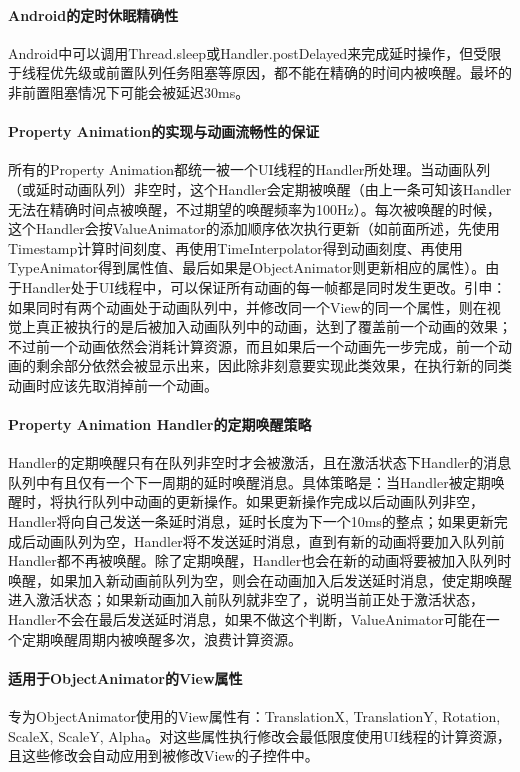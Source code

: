 \documentclass[UTF8]{ctexart}
\begin{document}
    \paragraph{Android的定时休眠精确性}
    Android中可以调用Thread.sleep或Handler.postDelayed来完成延时操作，但受限于线程优先级或前置队列任务阻塞等原因，都不能在精确的时间内被唤醒。最坏的非前置阻塞情况下可能会被延迟30ms。
    \paragraph{Property Animation的实现与动画流畅性的保证}
    所有的Property Animation都统一被一个UI线程的Handler所处理。当动画队列（或延时动画队列）非空时，这个Handler会定期被唤醒（由上一条可知该Handler无法在精确时间点被唤醒，不过期望的唤醒频率为100Hz）。每次被唤醒的时候，这个Handler会按ValueAnimator的添加顺序依次执行更新（如前面所述，先使用Timestamp计算时间刻度、再使用TimeInterpolator得到动画刻度、再使用TypeAnimator得到属性值、最后如果是ObjectAnimator则更新相应的属性）。由于Handler处于UI线程中，可以保证所有动画的每一帧都是同时发生更改。引申：如果同时有两个动画处于动画队列中，并修改同一个View的同一个属性，则在视觉上真正被执行的是后被加入动画队列中的动画，达到了覆盖前一个动画的效果；不过前一个动画依然会消耗计算资源，而且如果后一个动画先一步完成，前一个动画的剩余部分依然会被显示出来，因此除非刻意要实现此类效果，在执行新的同类动画时应该先取消掉前一个动画。
    \paragraph{Property Animation Handler的定期唤醒策略}
    Handler的定期唤醒只有在队列非空时才会被激活，且在激活状态下Handler的消息队列中有且仅有一个下一周期的延时唤醒消息。具体策略是：当Handler被定期唤醒时，将执行队列中动画的更新操作。如果更新操作完成以后动画队列非空，Handler将向自己发送一条延时消息，延时长度为下一个10ms的整点；如果更新完成后动画队列为空，Handler将不发送延时消息，直到有新的动画将要加入队列前Handler都不再被唤醒。除了定期唤醒，Handler也会在新的动画将要被加入队列时唤醒，如果加入新动画前队列为空，则会在动画加入后发送延时消息，使定期唤醒进入激活状态；如果新动画加入前队列就非空了，说明当前正处于激活状态，Handler不会在最后发送延时消息，如果不做这个判断，ValueAnimator可能在一个定期唤醒周期内被唤醒多次，浪费计算资源。
    \paragraph{适用于ObjectAnimator的View属性}
    专为ObjectAnimator使用的View属性有：TranslationX, TranslationY, Rotation, ScaleX, ScaleY, Alpha。对这些属性执行修改会最低限度使用UI线程的计算资源，且这些修改会自动应用到被修改View的子控件中。
\end{document}
